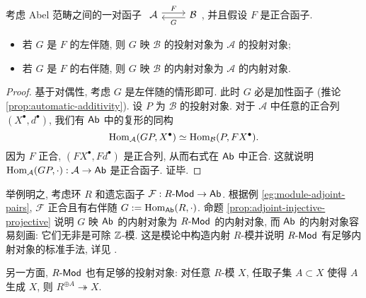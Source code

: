 \begin{proposition}\label{prop:adjoint-injective-projective}
	考虑 Abel 范畴之间的一对函子
	$\begin{tikzcd}
		\mathcal{A} \arrow[r, shift left, "F"] & \mathcal{B} \arrow[l, shift left, "G"]
	\end{tikzcd}$,
	并且假设 $F$ 是正合函子.
	\begin{itemize}
		\item 若 $G$ 是 $F$ 的左伴随, 则 $G$ 映 $\mathcal{B}$ 的投射对象为 $\mathcal{A}$ 的投射对象;
		\item 若 $G$ 是 $F$ 的右伴随, 则 $G$ 映 $\mathcal{B}$ 的内射对象为 $\mathcal{A}$ 的内射对象.
	\end{itemize}
\end{proposition}
\begin{proof}
	基于对偶性, 考虑 $G$ 是左伴随的情形即可. 此时 $G$ 必是加性函子 (推论 \ref{prop:automatic-additivity}). 设 $P$ 为 $\mathcal{B}$ 的投射对象. 对于 $\mathcal{A}$ 中任意的正合列 $(X^\bullet, d^\bullet)$, 我们有 $\mathsf{Ab}$ 中的复形的同构
	\[ \operatorname{Hom}_{\mathcal{A}}(GP, X^\bullet) \simeq \operatorname{Hom}_{\mathcal{B}}(P, FX^\bullet). \]
	因为 $F$ 正合, $(FX^\bullet, Fd^\bullet)$ 是正合列, 从而右式在 $\mathsf{Ab}$ 中正合. 这就说明 $\operatorname{Hom}_{\mathcal{A}}(GP, \cdot): \mathcal{A} \to \mathsf{Ab}$ 是正合函子. 证毕.
\end{proof}

举例明之, 考虑环 $R$ 和遗忘函子 $\mathcal{F}: R\text{-}\mathsf{Mod} \to \mathsf{Ab}$. 根据例 \ref{eg:module-adjoint-pairs}, $\mathcal{F}$ 正合且有右伴随 $G := \operatorname{Hom}_{\mathsf{Ab}}(R, \cdot)$. 命题 \ref{prop:adjoint-injective-projective} 说明 $G$ 映 $\mathsf{Ab}$ 的内射对象为 $R\text{-}\mathsf{Mod}$ 的内射对象, 而 $\mathsf{Ab}$ 的内射对象容易刻画: 它们无非是可除 $\mathbb{Z}$-模. 这是模论中构造内射 $R$-模并说明 $R\text{-}\mathsf{Mod}$ 有足够内射对象的标准手法, 详见 \cite[定理 6.9.14]{Li1}.

另一方面, $R\text{-}\mathsf{Mod}$ 也有足够的投射对象: 对任意 $R$-模 $X$, 任取子集 $A \subset X$ 使得 $A$ 生成 $X$, 则 $R^{\oplus A} \twoheadrightarrow X$.

